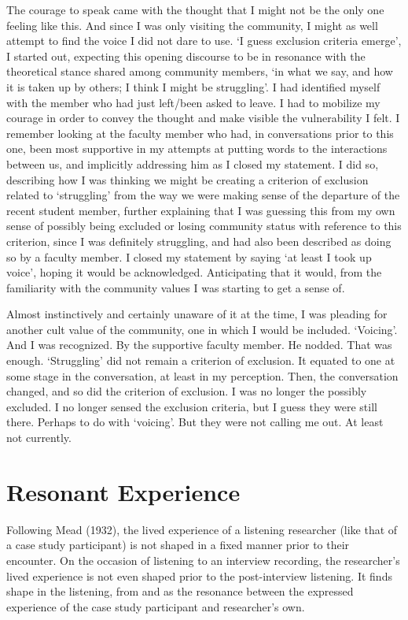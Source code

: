 The courage to speak came with the thought that I might not be the only one feeling like this. And since I was only visiting the community, I might as well attempt to find the voice I did not dare to use. ‘I guess exclusion criteria emerge’, I started out, expecting this opening discourse to be in resonance with the theoretical stance shared among community members, ‘in what we say, and how it is taken up by others; I think I might be struggling’. I had identified myself with the member who had just left/been asked to leave. I had to mobilize my courage in order to convey the thought and make visible the vulnerability I felt. I remember looking at the faculty member who had, in conversations prior to this one, been most supportive in my attempts at putting words to the interactions between us, and implicitly addressing him as I closed my statement. I did so, describing how I was thinking we might be creating a criterion of exclusion related to ‘struggling’ from the way we were making sense of the departure of the recent student member, further explaining that I was guessing this from my own sense of possibly being excluded or losing community status with reference to this criterion, since I was definitely struggling, and had also been described as doing so by a faculty member. I closed my statement by saying ‘at least I took up voice’, hoping it would be acknowledged. Anticipating that it would, from the familiarity with the community values I was starting to get a sense of. 

Almost instinctively and certainly unaware of it at the time, I was pleading for another cult value of the community, one in which I would be included. ‘Voicing’. And I was recognized. By the supportive faculty member. He nodded. That was enough. ‘Struggling’ did not remain a criterion of exclusion. It equated to one at some stage in the conversation, at least in my perception. Then, the conversation changed, and so did the criterion of exclusion. I was no longer the possibly excluded. I no longer sensed the exclusion criteria, but I guess they were still there. Perhaps to do with ‘voicing’. But they were not calling me out. At least not currently.

\chapter{Resonant Experience}
Following Mead (1932), the lived experience of a listening researcher (like that of a case study participant) is not shaped in a fixed manner prior to their encounter. On the occasion of listening to an interview recording, the researcher’s lived experience is not even shaped prior to the post-interview listening. It finds shape in the listening, from and as the resonance between the expressed experience of the case study participant and researcher’s own. 

